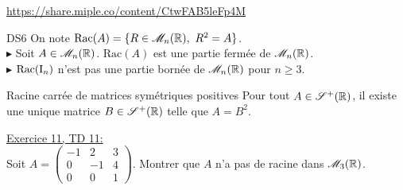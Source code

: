 \url{https://share.miple.co/content/CtwFAB5leFp4M}

\begin{box_titre}{DS6}
    On note $\mathrm{Rac}(A) = \{ R \in \mathscr{M}_n(\mathbb{R}),\ R^2 = A \}$. \\
    $\blacktriangleright$ Soit $A \in \mathscr{M}_n(\mathbb{R})$. $\mathrm{Rac}(A)$ est une partie fermée de $\mathscr{M}_n(\mathbb{R})$. \\
    $\blacktriangleright$ $\mathrm{Rac}(\mathrm{I}_n)$ n'est pas une partie bornée de $\mathscr{M}_n(\mathbb{R})$ pour $n \geqslant 3$. 
\end{box_titre}

\begin{box_titre}{Racine carrée de matrices symétriques positives}
    Pour tout $A \in \mathscr{S}^+(\mathbb{R})$, il existe une unique matrice $B \in \mathscr{S}^+(\mathbb{R})$ telle que $A = B^2$. 
\end{box_titre}

\underline{Exercice 11, TD 11:}\\
Soit $A = 
\begin{pmatrix}
    -1 & 2 & 3 \\
    0 & - 1 & 4 \\
    0 & 0 & 1
\end{pmatrix}. 
$ Montrer que $A$ n'a pas de racine dans $\mathscr{M}_3(\mathbb{R})$. 